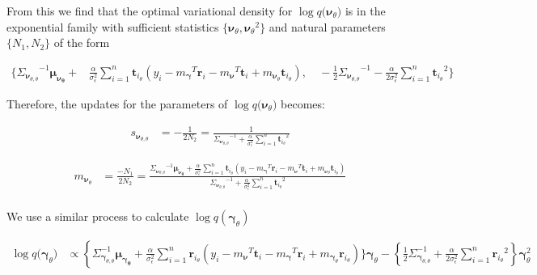 \documentclass[letterpaper,12pt]{article}
\newcommand{\lc}{\left \{} %
\newcommand{\rc}{\right \}} %
\newcommand{\lp}{\left (} %
\newcommand{\rp}{\right )} %
\newcommand{\sigmaepsilon}{\sigma_\epsilon^2} %
\newcommand{\rvec}[1]{\ensuremath{\boldsymbol{r}_{#1}}} %
\newcommand{\nuv}{\boldsymbol{\nu}} %
\newcommand{\gammav}{\boldsymbol{\gamma}} %
\newcommand{\ti}{\boldsymbol{t}_i} %
\newcommand{\ri}{\boldsymbol{r}_i} %
\newcommand{\mnu}{\ensuremath{m_\nuv}} %
\newcommand{\mgamma}{m_\gammav} %
\newcommand{\qtheta}{\ensuremath{q(\boldsymbol{\nu}_\theta})}
\newcommand{\qgammatheta}{\ensuremath{q(\boldsymbol{\gamma}_\theta})}
\newcommand{\tthetatilde}{\ensuremath{\boldsymbol{t}_{i_\theta}}} %
\newcommand{\nutheta}{\ensuremath{\nuv_\theta}} %
\newcommand{\meannutheta}{\ensuremath{\boldsymbol{\mu_{\nuv_\theta}}}} %
\newcommand{\sigmanutheta}{\ensuremath{\Sigma_{\nuv_{\theta, \theta}}}}
\newcommand{\meangammatheta}{\ensuremath{\boldsymbol{\mu_{\gammav_\theta}}}} %
\newcommand{\mnusub}[1]{\ensuremath{m_{\nuv_#1}}} %
\newcommand{\mgammasub}[1]{\ensuremath{m_{\gammav_#1}}} %
\begin{document}
From this we find that the optimal variational density for $\log \qtheta$ is in the exponential family with sufficient statistics $\{ \nutheta,\nutheta^2\}$ and natural parameters $\{N_1,N_2\}$ of the form

\begin{equation}
\begin{split}
    \Bigg\{ \sigmanutheta^{-1} \meannutheta + &\frac{\alpha}{ \sigmaepsilon} \sum_{i=1}^n \tthetatilde \lp y_i - {\mgamma}^T \ri - {\mnu}^T \ti + \mnusub{\theta} \tthetatilde \rp , \quad - \frac{1}{2} \sigmanutheta^{-1} - \frac{\alpha}{2 \sigmaepsilon} \sum_{i=1}^n  \tthetatilde^2 \Bigg\}
\end{split}
\end{equation}

Therefore, the updates for the parameters of $\log \qtheta$ becomes:

\begin{equation}
\begin{split}
    s_{\nuv_{\theta, \theta}} &= - \frac{1}{2N_2} = \frac{1}{\sigmanutheta^{-1} + \frac{\alpha}{ \sigmaepsilon} \sum_{i=1}^n  \tthetatilde^2 }
\end{split}
\end{equation}

\begin{equation}
\begin{split}
    \mnusub{\theta} &= \frac{-N_1}{2N_2} = \frac{\sigmanutheta^{-1} \meannutheta + \frac{\alpha}{ \sigmaepsilon} \sum_{i=1}^n \tthetatilde \lp y_i - {\mgamma}^T \ri - {\mnu}^T \ti + \mnusub{\theta} \tthetatilde \rp }{ \sigmanutheta^{-1} + \frac{\alpha}{ \sigmaepsilon} \sum_{i=1}^n \tthetatilde^2 }\\
\end{split}
\end{equation}

We use a similar process to calculate $\log q(\gammav_\theta)$

\begin{equation}
\begin{split}
     \log \qgammatheta &\propto  \lc \Sigma_{\gammav_{\theta, \theta}}^{-1} \meangammatheta + \frac{\alpha}{ \sigmaepsilon} \sum_{i=1}^n \rvec{i_\theta} \lp y_i - {\mnu}^T \ti - {\mgamma}^T \ri + \mgammasub{\theta} \rvec{i_\theta} \rp \Bigg\} \gammav_\theta - \lc \frac{1}{2}  \Sigma_{\gammav_{\theta, \theta}}^{-1} + \frac{\alpha}{2 \sigmaepsilon} \sum_{i=1}^n \rvec{i_\theta}^2 \rc \gammav_\theta^2
\end{split}
\end{equation}
\end{document}
